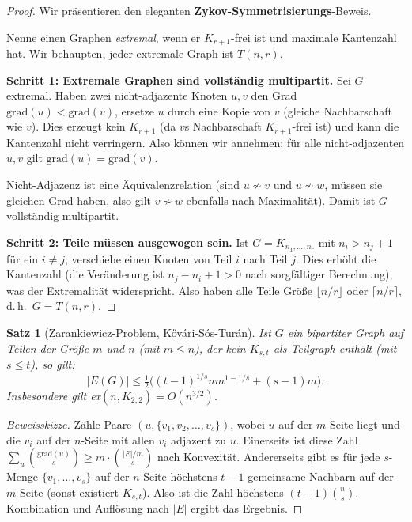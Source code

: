\documentclass[12pt,a4paper]{amsart}
\newtheorem{theorem}{Satz}[section]
\theoremstyle{definition}
\theoremstyle{remark}
\newcommand{\grad}{\mathrm{grad}}
\begin{document}
\begin{proof}
Wir präsentieren den eleganten \textbf{Zykov-Symmetrisierungs}-Beweis.

Nenne einen Graphen \emph{extremal}, wenn er $K_{r+1}$-frei ist und maximale
Kantenzahl hat. Wir behaupten, jeder extremale Graph ist $T(n,r)$.

\textbf{Schritt 1: Extremale Graphen sind vollständig multipartit.}
Sei $G$ extremal. Haben zwei nicht-adjazente Knoten $u, v$ den Grad
$\grad(u) < \grad(v)$, ersetze $u$ durch eine Kopie von $v$ (gleiche Nachbarschaft
wie $v$). Dies erzeugt kein $K_{r+1}$ (da $v$s Nachbarschaft $K_{r+1}$-frei
ist) und kann die Kantenzahl nicht verringern. Also können wir annehmen: für
alle nicht-adjazenten $u,v$ gilt $\grad(u) = \grad(v)$.

Nicht-Adjazenz ist eine Äquivalenzrelation (sind $u \not\sim v$ und
$u \not\sim w$, müssen sie gleichen Grad haben, also gilt $v \not\sim w$
ebenfalls nach Maximalität). Damit ist $G$ vollständig multipartit.

\textbf{Schritt 2: Teile müssen ausgewogen sein.}
Ist $G = K_{n_1, \ldots, n_r}$ mit $n_i > n_j + 1$ für ein $i \ne j$,
verschiebe einen Knoten von Teil $i$ nach Teil $j$. Dies erhöht die Kantenzahl
(die Veränderung ist $n_j - n_i + 1 > 0$ nach sorgfältiger Berechnung),
was der Extremalität widerspricht. Also haben alle Teile Größe
$\lfloor n/r\rfloor$ oder $\lceil n/r\rceil$, d.\,h.\ $G = T(n,r)$.
\end{proof}

\begin{theorem}[Zarankiewicz-Problem, Kővári-Sós-Turán]
\label{satz:zarankiewicz}
Ist $G$ ein bipartiter Graph auf Teilen der Größe $m$ und $n$ (mit $m \le n$),
der kein $K_{s,t}$ als Teilgraph enthält (mit $s \le t$), so gilt:
\[
  |E(G)| \le \tfrac{1}{2}\bigl((t-1)^{1/s} n m^{1-1/s} + (s-1)m\bigr).
\]
Insbesondere gilt ex$(n, K_{2,2}) = O(n^{3/2})$.
\end{theorem}

\begin{proof}[Beweisskizze]
Zähle Paare $(u, \{v_1, v_2, \ldots, v_s\})$, wobei $u$ auf der $m$-Seite
liegt und die $v_i$ auf der $n$-Seite mit allen $v_i$ adjazent zu $u$. Einerseits
ist diese Zahl $\sum_{u} \binom{\grad(u)}{s} \ge m \cdot \binom{|E|/m}{s}$
nach Konvexität. Andererseits gibt es für jede $s$-Menge $\{v_1, \ldots, v_s\}$
auf der $n$-Seite höchstens $t-1$ gemeinsame Nachbarn auf der $m$-Seite
(sonst existiert $K_{s,t}$). Also ist die Zahl höchstens $(t-1)\binom{n}{s}$.
Kombination und Auflösung nach $|E|$ ergibt das Ergebnis.
\end{proof}
\end{document}
